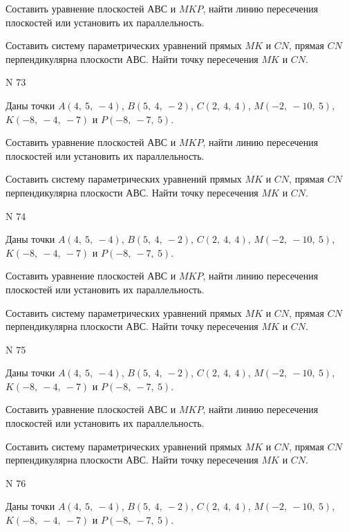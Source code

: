 \documentclass[11pt]{report}
\begin{document}
Составить уравнение плоскостей $АВС$ и $MKP$,
найти линию пересечения плоскостей или установить их параллельность.

Составить систему параметрических уравнений прямых $MK$ и $CN$,
прямая $CN$ перпендикулярна плоскости $АВС$. 
Найти точку пересечения $MK$ и $CN$.



 N 73

Даны точки $A\left( 4, \  5, \  -4\right)$, $B\left( 5, \  4, \  -2\right)$, $C\left( 2, \  4, \  4\right)$, $M\left( -2, \  -10, \  5\right)$, $K\left( -8, \  -4, \  -7\right)$ и $P\left( -8, \  -7, \  5\right)$.


Составить уравнение плоскостей $АВС$ и $MKP$,
найти линию пересечения плоскостей или установить их параллельность.

Составить систему параметрических уравнений прямых $MK$ и $CN$,
прямая $CN$ перпендикулярна плоскости $АВС$. 
Найти точку пересечения $MK$ и $CN$.



 N 74

Даны точки $A\left( 4, \  5, \  -4\right)$, $B\left( 5, \  4, \  -2\right)$, $C\left( 2, \  4, \  4\right)$, $M\left( -2, \  -10, \  5\right)$, $K\left( -8, \  -4, \  -7\right)$ и $P\left( -8, \  -7, \  5\right)$.


Составить уравнение плоскостей $АВС$ и $MKP$,
найти линию пересечения плоскостей или установить их параллельность.

Составить систему параметрических уравнений прямых $MK$ и $CN$,
прямая $CN$ перпендикулярна плоскости $АВС$. 
Найти точку пересечения $MK$ и $CN$.



 N 75

Даны точки $A\left( 4, \  5, \  -4\right)$, $B\left( 5, \  4, \  -2\right)$, $C\left( 2, \  4, \  4\right)$, $M\left( -2, \  -10, \  5\right)$, $K\left( -8, \  -4, \  -7\right)$ и $P\left( -8, \  -7, \  5\right)$.


Составить уравнение плоскостей $АВС$ и $MKP$,
найти линию пересечения плоскостей или установить их параллельность.

Составить систему параметрических уравнений прямых $MK$ и $CN$,
прямая $CN$ перпендикулярна плоскости $АВС$. 
Найти точку пересечения $MK$ и $CN$.



 N 76

Даны точки $A\left( 4, \  5, \  -4\right)$, $B\left( 5, \  4, \  -2\right)$, $C\left( 2, \  4, \  4\right)$, $M\left( -2, \  -10, \  5\right)$, $K\left( -8, \  -4, \  -7\right)$ и $P\left( -8, \  -7, \  5\right)$.
\end{document}
